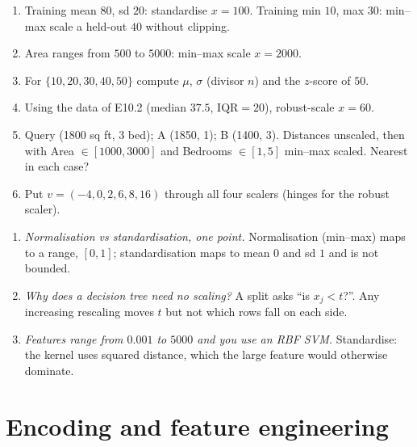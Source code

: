 \documentclass[11pt]{article}
\newcommand{\IQR}{\mathrm{IQR}}
\begin{document}
\begin{tryit}
\begin{enumerate}[label=\textbf{E11.\arabic*}]
  \item Training mean $80$, sd $20$: standardise $x = 100$. Training min $10$,
    max $30$: min--max scale a held-out $40$ without clipping.
  \item Area ranges from $500$ to $5000$: min--max scale $x = 2000$.
  \item For $\{10, 20, 30, 40, 50\}$ compute $\mu$, $\sigma$ (divisor $n$) and
    the $z$-score of $50$.
  \item Using the data of E10.2 (median $37.5$, $\IQR = 20$), robust-scale
    $x = 60$.
  \item Query (1800 sq ft, 3 bed); A (1850, 1); B (1400, 3). Distances
    unscaled, then with Area $\in [1000, 3000]$ and Bedrooms $\in [1, 5]$
    min--max scaled. Nearest in each case?
  \item Put $v = (-4, 0, 2, 6, 8, 16)$ through all four scalers (hinges for the
    robust scaler).
\end{enumerate}
\end{tryit}

\begin{concept}
\begin{enumerate}[label=\textbf{C11.\arabic*}]
  \item \emph{Normalisation vs standardisation, one point.} Normalisation
    (min--max) maps to a range, $[0,1]$; standardisation maps to mean $0$ and
    sd $1$ and is not bounded.
  \item \emph{Why does a decision tree need no scaling?} A split asks ``is
    $x_j < t$?''. Any increasing rescaling moves $t$ but not which rows fall
    on each side.
  \item \emph{Features range from $0.001$ to $5000$ and you use an RBF SVM.}
    Standardise: the kernel uses squared distance, which the large feature
    would otherwise dominate.
\end{enumerate}
\end{concept}
\section{Encoding and feature engineering}
\label{sec:encoding}
\end{document}
